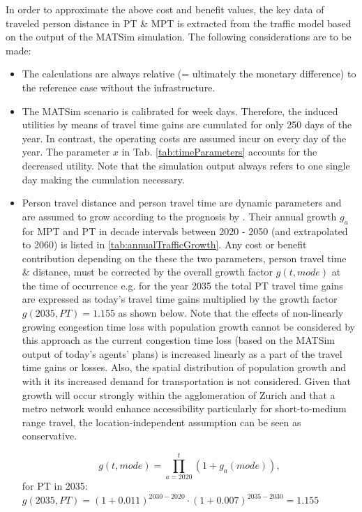 \vspace{-5ex} In order to approximate the above cost and benefit values, the key data of traveled person distance in PT \& MPT is extracted from the traffic model based on the output of the MATSim simulation. The following considerations are to be made:
\begin{itemize}
	\item The calculations are always relative (= ultimately the monetary difference) to the reference case without the infrastructure.
	\item The MATSim scenario is calibrated for week days. Therefore, the induced utilities by means of travel time gains are cumulated for only 250 days of the year. In contrast, the operating costs are assumed incur on every day of the year. The parameter $x$ in Tab. \ref{tab:timeParameters} accounts for the decreased utility. Note that the simulation output always refers to one single day making the cumulation necessary.
	\item Person travel distance and person travel time are dynamic parameters and are assumed to grow according to the prognosis by \cite{ARE2016}. Their annual growth $g_a$ for MPT and PT in decade intervals between 2020 - 2050 (and extrapolated to 2060) is listed in \ref{tab:annualTrafficGrowth}. Any cost or benefit contribution depending on the these the two parameters, person travel time \& distance, must be corrected by the overall growth factor $g(t,mode)$ at the time of occurrence e.g. for the year 2035 the total PT travel time gains are expressed as today's travel time gains multiplied by the growth factor $g(2035, PT) =1.155$ as shown below. Note that the effects of non-linearly growing congestion time loss with population growth cannot be considered by this approach as the current congestion time loss (based on the MATSim output of today's agents' plans) is increased linearly as a part of the travel time gains or losses. Also, the spatial distribution of population growth and with it its increased demand for transportation is not considered. Given that growth will occur strongly within the agglomeration of Zurich and that a metro network would enhance accessibility particularly for short-to-medium range travel, the location-independent assumption can be seen as conservative.
	
	\begin{equation}
		\label{eq:annualTrafficGrowth}
		g(t,mode)=\prod_{a=2020}^{t} (1+g_a(mode)),
	\end{equation}
	for PT in 2035: $g(2035, PT)= (1+0.011)^{2030-2020}\cdot(1+0.007)^{2035-2030} =1.155$
	
	
\end{itemize}

